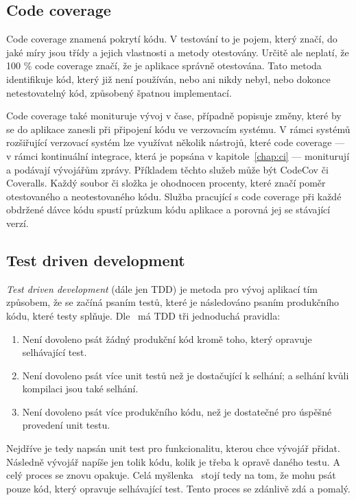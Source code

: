 \subsection{Code coverage}

Code coverage znamená pokrytí kódu.
V testování to je pojem,
který značí,
do jaké míry jsou třídy a jejich vlastnosti a metody otestovány.
Určitě ale neplatí,
že 100 \% code coverage značí,
že je aplikace správně otestována.
Tato metoda identifikuje kód,
který již není používán,
nebo ani nikdy nebyl,
nebo dokonce netestovatelný kód,
způsobený špatnou implementací.
\cite{code_coverage}

Code coverage také monituruje vývoj v čase,
případně popisuje změny,
které by se do aplikace zanesli při připojení kódu ve verzovacím systému.
V rámci systémů rozšiřující verzovací systém lze využívat několik nástrojů,
které code coverage
--- v rámci kontinuální integrace, která je popsána v kapitole~\ref{chap:ci} ---
moniturují a podávají vývojářům zprávy.
Příkladem těchto služeb může být CodeCov či Coveralls.
Každý soubor či složka je ohodnocen procenty,
které značí poměr otestovaného a neotestovaného kódu.
Služba pracující s code coverage při každé obdržené dávce kódu spustí
průzkum kódu aplikace a porovná jej se stávající verzí.
\cite{code_coverage}

\subsection{Test driven development}
\label{sec:tdd}

\emph{Test driven development} (dále jen TDD) je metoda pro vývoj aplikací tím
způsobem,
že se začíná psaním testů,
které je následováno psaním produkčního kódu,
které testy splňuje.
Dle~\cite{tdd} má TDD tři jednoduchá pravidla:

\begin{enumerate}
    \item Není dovoleno psát žádný produkční kód kromě toho,
    který opravuje selhávající test.
    \item Není dovoleno psát více unit testů než je dostačující k selhání;
    a selhání kvůli kompilaci jsou také selhání.
    \item Není dovoleno psát více produkčního kódu,
    než je dostatečné pro úspěšné provedení unit testu.
\end{enumerate}

Nejdříve je tedy napsán unit test pro funkcionalitu,
kterou chce vývojář přidat.
Následně vývojář napíše jen tolik kódu,
kolik je třeba k opravě daného testu.
A celý proces se znovu opakuje.
Celá myšlenka~\cite{tdd} stojí tedy na tom,
že mohu psát pouze kód,
který opravuje selhávající test.
Tento proces se zdánlivě zdá  a pomalý.
~\cite{tdd}
 
